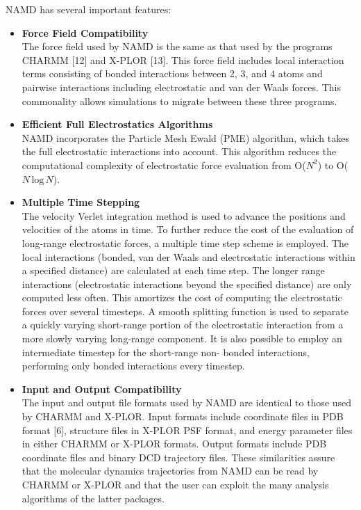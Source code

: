 NAMD has several important features:
\begin{itemize}
\item \textbf{Force Field Compatibility}\\
The force field used by NAMD is the same as that used by the programs CHARMM [12] and X-PLOR [13]. This force field includes local interaction terms consisting of bonded interactions between 2, 3, and 4 atoms and pairwise interactions including electrostatic and van der Waals forces. This commonality allows simulations to migrate between these three programs.
\item \textbf{Efficient Full Electrostatics Algorithms}\\
NAMD incorporates the Particle Mesh Ewald (PME) algorithm, which takes the full electrostatic interactions into account. This algorithm reduces the computational complexity of electrostatic force evaluation from O($N^2$) to O($N \, \text{log} \, N$).
\item \textbf{Multiple Time Stepping}\\
The velocity Verlet integration method is used to advance the positions and velocities of the atoms in time. To further reduce the cost of the evaluation of long-range electrostatic forces, a multiple time step scheme is employed. The local interactions (bonded, van der Waals and electrostatic interactions within a specified distance) are calculated at each time step. The longer range interactions (electrostatic interactions beyond the specified distance) are only computed less often. This amortizes the cost of computing the electrostatic forces over several timesteps. A smooth splitting function is used to separate a quickly varying short-range portion of the electrostatic interaction from a more slowly varying long-range component. It is also possible to employ an intermediate timestep for the short-range non- bonded interactions, performing only bonded interactions every timestep.
\item \textbf{Input and Output Compatibility}\\
The input and output file formats used by NAMD are identical to those used by CHARMM and X-PLOR. Input formats include coordinate files in PDB format [6], structure files in X-PLOR PSF format, and energy parameter files in either CHARMM or X-PLOR formats. Output formats include PDB coordinate files and binary DCD trajectory files. These similarities assure that the molecular dynamics trajectories from NAMD can be read by CHARMM or X-PLOR and that the user can exploit the many analysis algorithms of the latter packages.

\end{itemize}
